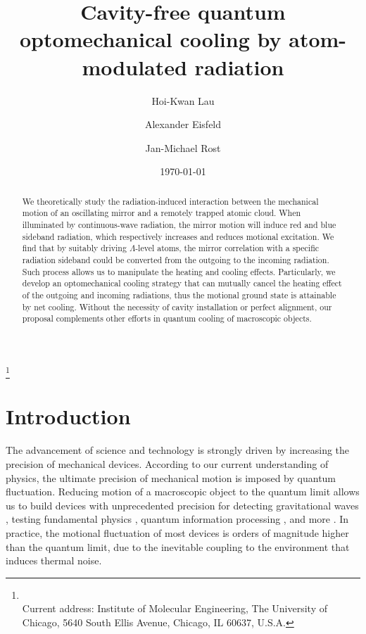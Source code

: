 \documentclass[aps, pra, reprint, amsmath, amssymb, groupedaddress, acknowledgments]{revtex4-1}
\begin{document}
\title{Cavity-free quantum optomechanical cooling by atom-modulated radiation}

\author{Hoi-Kwan Lau} 
\thanks{\\Current address: Institute of Molecular Engineering, The University of Chicago, 5640 South Ellis Avenue, Chicago, IL 60637, U.S.A.}
\author{Alexander Eisfeld}
\author{Jan-Michael Rost}


\date{\today} 

\begin{abstract}
We theoretically study the radiation-induced interaction between the mechanical motion of an oscillating mirror and a remotely trapped atomic cloud.  When illuminated by continuous-wave radiation, the mirror motion will induce red and blue sideband radiation, which respectively increases and reduces motional excitation.  We find that by suitably driving $\Lambda$-level atoms, the mirror correlation with a specific radiation sideband could be converted from the outgoing to the incoming radiation.  Such process allows us to manipulate the heating and cooling effects.  Particularly, we develop an optomechanical cooling strategy that can mutually cancel the heating effect of the outgoing and incoming radiations, thus the motional ground state is attainable by net cooling.  Without the necessity of cavity installation or perfect alignment, our proposal complements other efforts in quantum cooling of macroscopic objects.
\end{abstract}

\pacs{}

\maketitle

\section{Introduction}

The advancement of science and technology is strongly driven by increasing the precision of mechanical devices.  According to our current understanding of physics, the ultimate precision of mechanical motion is imposed by quantum fluctuation.  Reducing motion of a macroscopic object to the quantum limit allows us to build devices with unprecedented precision for detecting gravitational waves \cite{1980PhRvL..45...75C, 1996PhLA..218..164B, 1997PhLA..232..340B, 1997PhLA..233..303R}, testing fundamental physics \cite{Pikovski:2012hp,Marshall:2003kj}, quantum information processing \cite{Rabl:2010kk, 2013PhRvL.110l0503R}, and more \cite{Poot:2012fh, 2012PhT....65g..29A}.  In practice, the motional fluctuation of most devices is orders of magnitude higher than the quantum limit, due to the inevitable coupling to the environment that induces thermal noise.  
\end{document}
